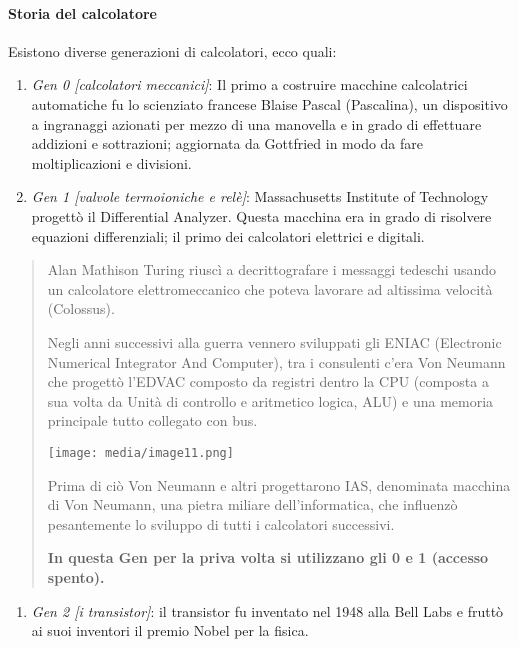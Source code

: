 \paragraph{Storia del calcolatore}\label{storia-del-calcolatore}

Esistono diverse generazioni di calcolatori, ecco quali:

\begin{enumerate}
\def\labelenumi{\arabic{enumi}.}
\item
  \emph{Gen 0 {[}calcolatori meccanici{]}}: Il primo a costruire
  macchine calcolatrici automatiche fu lo scienziato francese Blaise
  Pascal (Pascalina), un dispositivo a ingranaggi azionati per mezzo di
  una manovella e in grado di effettuare addizioni e sottrazioni;
  aggiornata da Gottfried in modo da fare moltiplicazioni e divisioni.
\item
  \emph{Gen 1 {[}valvole termoioniche e relè{]}}: Massachusetts
  Institute of Technology progettò il Differential Analyzer. Questa
  macchina era in grado di risolvere equazioni differenziali; il primo
  dei calcolatori elettrici e digitali.
\end{enumerate}

\begin{quote}
Alan Mathison Turing riuscì a decrittografare i messaggi tedeschi usando
un calcolatore elettromeccanico che poteva lavorare ad altissima
velocità (Colossus).

Negli anni successivi alla guerra vennero sviluppati gli ENIAC
(Electronic Numerical Integrator And Computer), tra i consulenti c'era
Von Neumann che progettò l'EDVAC composto da registri dentro la CPU
(composta a sua volta da Unità di controllo e aritmetico logica, ALU) e
una memoria principale tutto collegato con bus.

\texttt{[image: media/image11.png]}

Prima di ciò Von Neumann e altri progettarono IAS, denominata macchina
di Von Neumann, una pietra miliare dell'informatica, che influenzò
pesantemente lo sviluppo di tutti i calcolatori successivi.

\textbf{In questa Gen per la priva volta si utilizzano gli 0 e 1
(accesso spento).}
\end{quote}

\begin{enumerate}
\def\labelenumi{\arabic{enumi}.}
\setcounter{enumi}{2}
\item
  \emph{Gen 2 {[}i transistor{]}}: il transistor fu inventato nel 1948
  alla Bell Labs e fruttò ai suoi inventori il premio Nobel per la
  fisica.
\end{enumerate}

